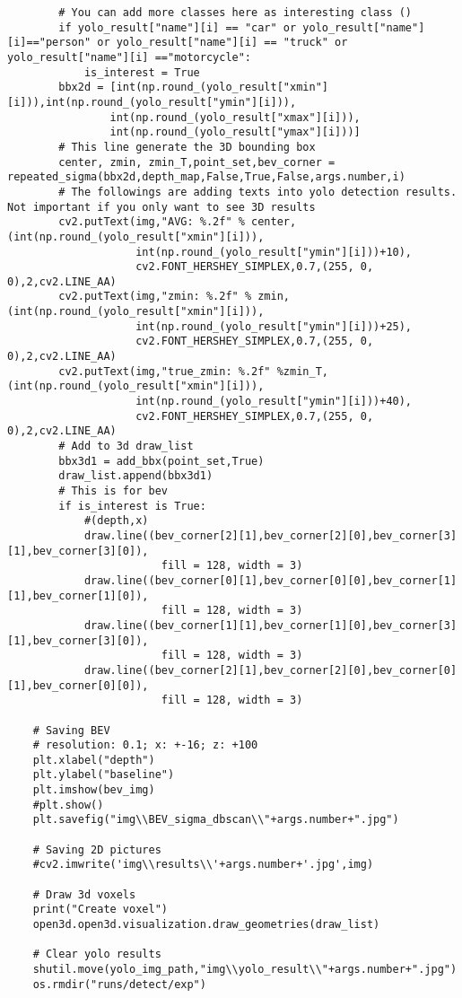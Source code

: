 \begin{verbatim}
        # You can add more classes here as interesting class ()
        if yolo_result["name"][i] == "car" or yolo_result["name"][i]=="person" or yolo_result["name"][i] == "truck" or yolo_result["name"][i] =="motorcycle":
            is_interest = True
        bbx2d = [int(np.round_(yolo_result["xmin"][i])),int(np.round_(yolo_result["ymin"][i])),
                int(np.round_(yolo_result["xmax"][i])),
                int(np.round_(yolo_result["ymax"][i]))]
        # This line generate the 3D bounding box
        center, zmin, zmin_T,point_set,bev_corner = repeated_sigma(bbx2d,depth_map,False,True,False,args.number,i)
        # The followings are adding texts into yolo detection results. Not important if you only want to see 3D results
        cv2.putText(img,"AVG: %.2f" % center,(int(np.round_(yolo_result["xmin"][i])),
                    int(np.round_(yolo_result["ymin"][i]))+10),
                    cv2.FONT_HERSHEY_SIMPLEX,0.7,(255, 0, 0),2,cv2.LINE_AA)
        cv2.putText(img,"zmin: %.2f" % zmin,(int(np.round_(yolo_result["xmin"][i])),
                    int(np.round_(yolo_result["ymin"][i]))+25),
                    cv2.FONT_HERSHEY_SIMPLEX,0.7,(255, 0, 0),2,cv2.LINE_AA)
        cv2.putText(img,"true_zmin: %.2f" %zmin_T,(int(np.round_(yolo_result["xmin"][i])),
                    int(np.round_(yolo_result["ymin"][i]))+40),
                    cv2.FONT_HERSHEY_SIMPLEX,0.7,(255, 0, 0),2,cv2.LINE_AA)
        # Add to 3d draw_list
        bbx3d1 = add_bbx(point_set,True)
        draw_list.append(bbx3d1)
        # This is for bev
        if is_interest is True:
            #(depth,x)
            draw.line((bev_corner[2][1],bev_corner[2][0],bev_corner[3][1],bev_corner[3][0]),
                        fill = 128, width = 3)
            draw.line((bev_corner[0][1],bev_corner[0][0],bev_corner[1][1],bev_corner[1][0]),
                        fill = 128, width = 3)
            draw.line((bev_corner[1][1],bev_corner[1][0],bev_corner[3][1],bev_corner[3][0]),
                        fill = 128, width = 3)
            draw.line((bev_corner[2][1],bev_corner[2][0],bev_corner[0][1],bev_corner[0][0]),
                        fill = 128, width = 3)

    # Saving BEV
    # resolution: 0.1; x: +-16; z: +100
    plt.xlabel("depth")
    plt.ylabel("baseline")
    plt.imshow(bev_img)
    #plt.show()
    plt.savefig("img\\BEV_sigma_dbscan\\"+args.number+".jpg")

    # Saving 2D pictures
    #cv2.imwrite('img\\results\\'+args.number+'.jpg',img)

    # Draw 3d voxels
    print("Create voxel")
    open3d.open3d.visualization.draw_geometries(draw_list)

    # Clear yolo results
    shutil.move(yolo_img_path,"img\\yolo_result\\"+args.number+".jpg")
    os.rmdir("runs/detect/exp")

\end{verbatim}
\newpage
